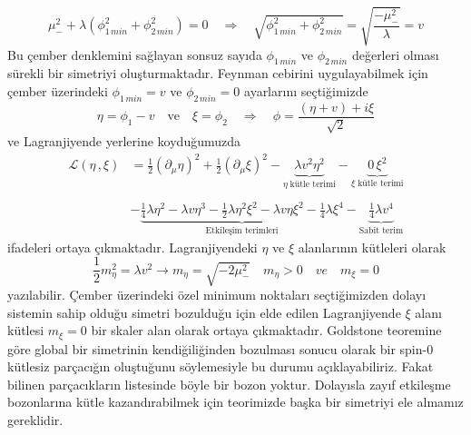 $$
\mu^{2}_{-} + \lambda \left( \phi_{1 \,min}^{2} + \phi_{2 \,min}^{2} \right) = 0 \quad \Rightarrow \quad  \sqrt{ \phi_{1 \,min}^{2} + \phi_{2 \,min}^{2} }  = \sqrt{ \frac{- \mu_{-}^{2}}{\lambda} } = v
$$
Bu çember denklemini sağlayan sonsuz sayıda $\phi_{1 \,min}$ ve $\phi_{2 \,min}$ değerleri olması sürekli bir simetriyi oluşturmaktadır. Feynman cebirini uygulayabilmek için çember üzerindeki $\phi_{1 \, min} = v$ ve $\phi_{2 \, min} = 0$ ayarlarını seçtiğimizde
$$
\eta = \phi_{1} - v \quad \textrm{ve} \quad \xi = \phi_{2} \quad \Rightarrow \quad \phi = \frac{ ( \eta + v ) + i \xi }{\sqrt{2}}
$$ 
ve Lagranjiyende yerlerine koyduğumuzda 
\begin{equation} \label{gs4}
\begin{aligned}
\mathcal{L} (\eta \,, \xi) &= \frac{1}{2} \left(\partial_{\mu} \eta \right)^{2} + \frac{1}{2} \left(\partial_{\mu} \xi \right)^{2} - \underbrace{\lambda v^{2} \eta^{2}}_{\eta\; \textrm{kütle terimi}} - \underbrace{0\, \xi^{2}}_{\xi \; \textrm{kütle terimi}} \\
\\
& - \underbrace{ \frac{1}{4} \lambda \eta^{2} - \lambda v \eta^{3} - \frac{1}{2} \lambda \eta^{2} \xi^{2} - \lambda v \eta \xi^{2} - \frac{1}{4} \lambda \xi^{4} }_{\textrm{Etkileşim terimleri}} - \underbrace{\frac{1}{4} \lambda v^{4}}_{\textrm{Sabit terim}}
\end{aligned}
\end{equation}
ifadeleri ortaya çıkmaktadır. Lagranjiyendeki $\eta$ ve $\xi$ alanlarının kütleleri olarak
\begin{equation} \label{gs5}
\frac{1}{2} m_{\eta}^{2} = \lambda v^2 \to  m_{\eta} = \sqrt{- 2 \mu^{2}_{-}} \quad m_{\eta} > 0 \quad ve \quad m_{\xi} = 0
\end{equation}
yazılabilir. Çember üzerindeki özel minimum noktaları seçtiğimizden dolayı sistemin sahip olduğu simetri bozulduğu için elde edilen Lagranjiyende $\xi$ alanı kütlesi $m_{\xi} = 0$  bir skaler alan olarak ortaya çıkmaktadır. Goldstone teoremine göre global bir simetrinin kendiğiliğinden bozulması sonucu olarak bir spin-0 kütlesiz parçacığın oluştuğunu söylemesiyle bu durumu açıklayabiliriz. Fakat bilinen parçacıkların listesinde böyle bir bozon yoktur. Dolayısla zayıf etkileşme bozonlarına kütle kazandırabilmek için teorimizde başka bir simetriyi ele almamız gereklidir.

